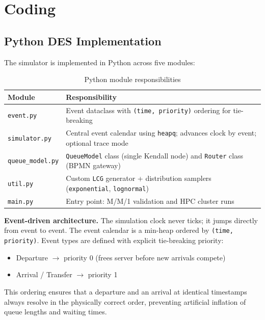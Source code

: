 \documentclass[11pt,a4paper]{article}
\begin{document}
\section{Coding}

\subsection{Python DES Implementation}

The simulator is implemented in Python across five modules:

\begin{table}[H]
\centering
\caption{Python module responsibilities}
\begin{tabularx}{\linewidth}{lX}
\toprule
\textbf{Module} & \textbf{Responsibility} \\
\midrule
\texttt{event.py}       & Event dataclass with \texttt{(time, priority)} ordering for tie-breaking \\
\texttt{simulator.py}   & Central event calendar using \texttt{heapq}; advances clock by event; optional trace mode \\
\texttt{queue\_model.py} & \texttt{QueueModel} class (single Kendall node) and \texttt{Router} class (BPMN gateway) \\
\texttt{util.py}        & Custom \texttt{LCG} generator + distribution samplers (\texttt{exponential}, \texttt{lognormal}) \\
\texttt{main.py}        & Entry point: M/M/1 validation and HPC cluster runs \\
\bottomrule
\end{tabularx}
\end{table}

\textbf{Event-driven architecture.} The simulation clock never ticks; it jumps directly from event to
event. The event calendar is a min-heap ordered by \texttt{(time, priority)}. Event types are defined
with explicit tie-breaking priority:

\begin{itemize}
  \item Departure $\to$ priority 0 (frees server before new arrivals compete)
  \item Arrival / Transfer $\to$ priority 1
\end{itemize}

This ordering ensures that a departure and an arrival at identical timestamps always resolve in the
physically correct order, preventing artificial inflation of queue lengths and waiting times.
\end{document}
